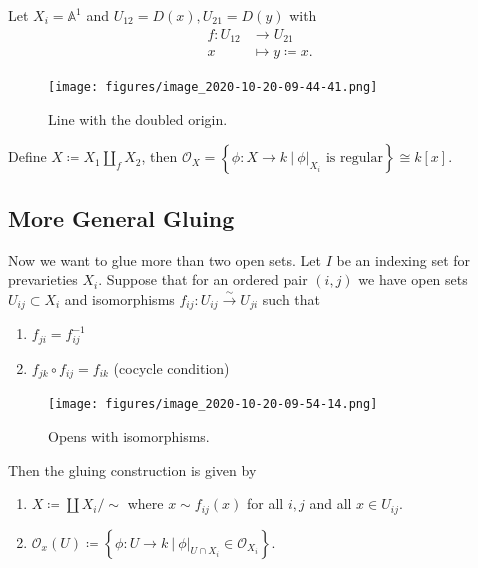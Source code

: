 \begin{example}

Let \(X_i = {\mathbb{A}}^1\) and \(U_{12} = D(x), U_{21} = D(y)\) with
\begin{align*}  
f: U_{12} &\to U_{21} \\
x &\mapsto y\coloneqq x
.\end{align*}

\begin{figure}
\centering
\texttt{[image: figures/image\_2020-10-20-09-44-41.png]}
\caption{Line with the doubled origin.}
\end{figure}

Define \(X\coloneqq X_1 {\coprod}_f X_2\), then
\({\mathcal{O}}_X = \left\{{\phi: X\to k {~\mathrel{\Big|}~}{ \left.{{\phi}} \right|_{{X_i}} } \text{ is regular}}\right\} \cong k[x]\).

\end{example}

\hypertarget{more-general-gluing}{%
\subsection{More General Gluing}\label{more-general-gluing}}

Now we want to glue more than two open sets. Let \(I\) be an indexing
set for prevarieties \(X_i\). Suppose that for an ordered pair
\((i, j)\) we have open sets \(U_{ij} \subset X_i\) and isomorphisms
\(f_{ij}: U_{ij} \xrightarrow{\sim} U_{ji}\) such that

\begin{enumerate}
\def\labelenumi{\alph{enumi}.}
\item
  \(f_{ji} = f_{ij}^{-1}\)
\item
  \(f_{jk} \circ f_{ij} = f_{ik}\) (cocycle condition)
\end{enumerate}

\begin{figure}
\centering
\texttt{[image: figures/image\_2020-10-20-09-54-14.png]}
\caption{Opens with isomorphisms.}
\end{figure}

Then the gluing construction is given by

\begin{enumerate}
\def\labelenumi{\arabic{enumi}.}
\item
  \(X\coloneqq{\coprod}X_i/\sim\) where \(x\sim f_{ij}(x)\) for all
  \(i,j\) and all \(x\in U_{ij}\).
\item
  \({\mathcal{O}}_x(U) \coloneqq\left\{{\phi:U\to k {~\mathrel{\Big|}~}{ \left.{{\phi}} \right|_{{U\cap X_i}} } \in {\mathcal{O}}_{X_i} }\right\}\).
\end{enumerate}

